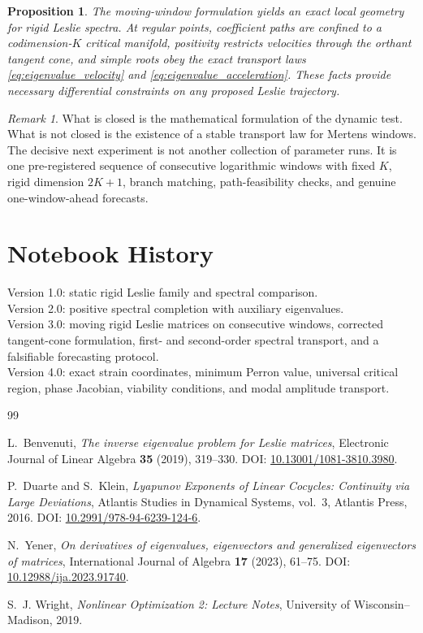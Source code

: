 \documentclass[11pt]{amsart}
\numberwithin{equation}{section}
\theoremstyle{plain}
\newtheorem{proposition}[theorem]{Proposition}
\theoremstyle{definition}
\theoremstyle{remark}
\newtheorem{remark}[theorem]{Remark}
\begin{document}
\begin{proposition}
\label{prop:final_conclusion}
The moving-window formulation yields an exact local geometry for rigid Leslie spectra.  At regular points, coefficient paths are confined to a codimension-$K$ critical manifold, positivity restricts velocities through the orthant tangent cone, and simple roots obey the exact transport laws \eqref{eq:eigenvalue_velocity} and \eqref{eq:eigenvalue_acceleration}.  These facts provide necessary differential constraints on any proposed Leslie trajectory.
\end{proposition}

\begin{remark}
\label{rem:final_status}
What is closed is the mathematical formulation of the dynamic test.  What is not closed is the existence of a stable transport law for Mertens windows.  The decisive next experiment is not another collection of parameter runs.  It is one pre-registered sequence of consecutive logarithmic windows with fixed $K$, rigid dimension $2K+1$, branch matching, path-feasibility checks, and genuine one-window-ahead forecasts.
\end{remark}

\section*{Notebook History}
Version 1.0: static rigid Leslie family and spectral comparison.\\
Version 2.0: positive spectral completion with auxiliary eigenvalues.\\
Version 3.0: moving rigid Leslie matrices on consecutive windows, corrected tangent-cone formulation, first- and second-order spectral transport, and a falsifiable forecasting protocol.\\
Version 4.0: exact strain coordinates, minimum Perron value, universal critical region, phase Jacobian, viability conditions, and modal amplitude transport.

\begin{thebibliography}{99}

L.~Benvenuti,
\emph{The inverse eigenvalue problem for Leslie matrices},
Electronic Journal of Linear Algebra \textbf{35} (2019), 319--330.
DOI: \href{https://doi.org/10.13001/1081-3810.3980}{10.13001/1081-3810.3980}.

P.~Duarte and S.~Klein,
\emph{Lyapunov Exponents of Linear Cocycles: Continuity via Large Deviations},
Atlantis Studies in Dynamical Systems, vol.~3, Atlantis Press, 2016.
DOI: \href{https://doi.org/10.2991/978-94-6239-124-6}{10.2991/978-94-6239-124-6}.

N.~Yener,
\emph{On derivatives of eigenvalues, eigenvectors and generalized eigenvectors of matrices},
International Journal of Algebra \textbf{17} (2023), 61--75.
DOI: \href{https://doi.org/10.12988/ija.2023.91740}{10.12988/ija.2023.91740}.

S.~J. Wright,
\emph{Nonlinear Optimization 2: Lecture Notes},
University of Wisconsin--Madison, 2019.

\end{thebibliography}
\end{document}

